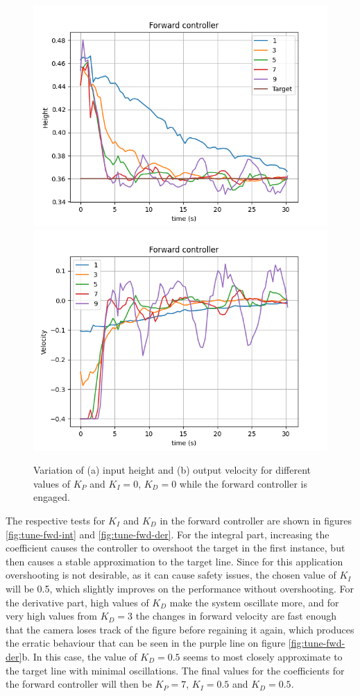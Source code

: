 \begin{figure}
  \centering
  \includegraphics[width=.45\linewidth]{img/pid/fwd/fwd_pos_prop_i0_d0.png}
  \includegraphics[width=.45\linewidth]{img/pid/fwd/fwd_vel_prop_i0_d0.png}
  \caption{Variation of (a) input height and (b) output velocity for different values of $K_{P}$ and $K_I=0$, $K_D=0$ while the forward controller is engaged.}\label{fig:tune-fwd-prop}
\end{figure}


The respective tests for $K_I$ and $K_D$ in the forward controller are shown in figures \ref{fig:tune-fwd-int} and \ref{fig:tune-fwd-der}.
For the integral part, increasing the coefficient causes the controller to overshoot the target in the first instance, but then causes a stable approximation to the target line.
Since for this application overshooting is not desirable, as it can cause safety issues, the chosen value of $K_I$ will be 0.5, which slightly improves on the performance without overshooting.
For the derivative part, high values of $K_D$ make the system oscillate more, and for very high values from $K_D=3$ the changes in forward velocity are fast enough that the camera loses track of the figure before regaining it again, which produces the erratic behaviour that can be seen in the purple line on figure \ref{fig:tune-fwd-der}b.
In this case, the value of $K_D=0.5$ seems to most closely approximate to the target line with minimal oscillations.
The final values for the coefficients for the forward controller will then be $K_P=7$, $K_I=0.5$ and $K_D=0.5$.


